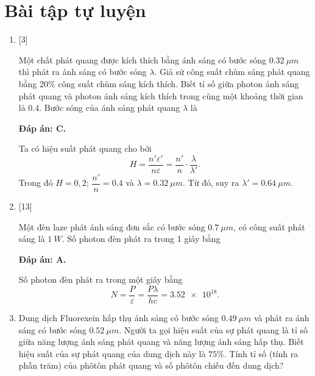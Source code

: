 \section{Bài tập tự luyện}
\begin{enumerate}[label=\bfseries Câu \arabic*:]
	
	\item {} [3] 
	\cauhoi
	{Một chất phát quang được kích thích bằng ánh sáng có bước sóng $ \SI{0,32}{\mu m} $ thì phát ra ánh sáng có bước sóng $\lambda $. Giả sử công suất chùm sáng phát quang bằng 20\% công suất chùm sáng kích thích. Biết tỉ số giữa photon ánh sáng phát quang và photon ánh sáng kích thích trong cùng một khoảng thời gian là $ \num{0,4} $. Bước sóng của ánh sáng phát quang $ \lambda $ là
	}
	
	\loigiai
	{		\textbf{Đáp án: C.}
		
		Ta có hiệu suất phát quang cho bởi
		$$
		H = \dfrac{n' \varepsilon'}{n \varepsilon} = \dfrac{n'}{n} \cdot \dfrac{\lambda}{\lambda'}.
		$$	
		Trong đó $ H = 0,2 $; $ \dfrac{n'}{n} = \num{0,4}$ và $ \lambda = \SI{0,32}{\mu m}$.
		Từ đó, suy ra $ \lambda' = \SI{0,64}{\mu m}$.
	}
	
	\item {}[13]
		\cauhoi
	{Một đèn laze phát ánh sáng đơn sắc có bước sóng $ \SI{0,7}{\mu m} $, có công suất phát sáng là $ \SI{1}{W} $. Số photon đèn phát ra trong 1 giây bằng
	}
	
	\loigiai
	{		\textbf{Đáp án: A.}
		
		Số photon đèn phát ra trong một giây bằng
		$$
		N = \dfrac{P}{\varepsilon} = \dfrac{P \lambda}{hc} = \num{3,52e18}.
		$$	
	}
	
		\item {}
		\cauhoi
	{Dung dịch Fluorexein hấp thụ ánh sáng có bước sóng $\SI{0,49}{\mu m}$ và phát ra ánh sáng có bước sóng $\SI{0,52}{\mu m}$. Người ta gọi hiệu suất của sự phát quang là tỉ số giữa năng lượng ánh sáng phát quang và năng lượng ánh sáng hấp thụ. Biết hiệu suất của sự phát quang của dung dịch này là $75\%$. Tính tỉ số (tính ra phần trăm) của phôtôn phát quang và số phôtôn chiếu đến dung dịch?
		
}
\end{enumerate}
